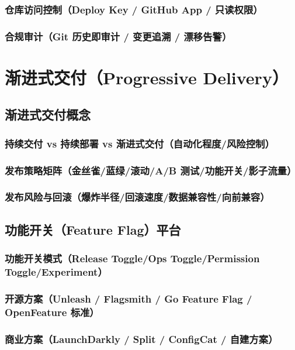 \documentclass[12pt,UTF8]{ctexbook}
\begin{document}
    \subsection{仓库访问控制（Deploy Key / GitHub App / 只读权限）}
    \subsection{合规审计（Git 历史即审计 / 变更追溯 / 漂移告警）}


\chapter{渐进式交付（Progressive Delivery）}
\label{chap:progressive-delivery}

  \section{渐进式交付概念}
    \subsection{持续交付 vs 持续部署 vs 渐进式交付（自动化程度/风险控制）}
    \subsection{发布策略矩阵（金丝雀/蓝绿/滚动/A/B 测试/功能开关/影子流量）}
    \subsection{发布风险与回滚（爆炸半径/回滚速度/数据兼容性/向前兼容）}

  \section{功能开关（Feature Flag）平台}
    \subsection{功能开关模式（Release Toggle/Ops Toggle/Permission Toggle/Experiment）}
    \subsection{开源方案（Unleash / Flagsmith / Go Feature Flag / OpenFeature 标准）}
    \subsection{商业方案（LaunchDarkly / Split / ConfigCat / 自建方案）}
\end{document}
